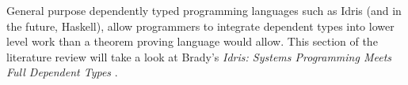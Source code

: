 General purpose dependently typed programming languages such as Idris (and in
the future, Haskell), allow programmers to integrate dependent types into lower
level work than a theorem proving language would allow. This section of the
literature review will take a look at Brady's \textit{Idris: Systems Programming
Meets Full Dependent Types} \cite{idris_systems_programming}.